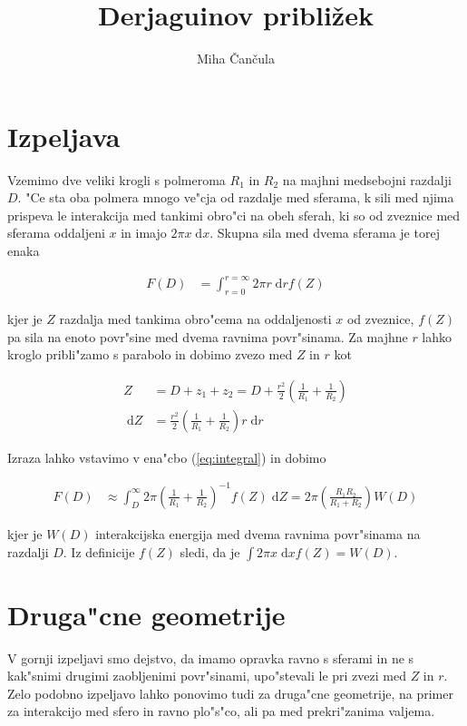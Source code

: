 \documentclass[a4paper,10pt]{article}
\title{Derjaguinov pribli\v zek}
\author{Miha \v Can\v cula}
\newcommand{\dd}{\;\mathrm{d}}
\begin{document}
\maketitle

\section{Izpeljava}

Vzemimo dve veliki krogli s polmeroma $R_1$ in $R_2$ na majhni medsebojni razdalji $D$. 
"Ce sta oba polmera mnogo ve"cja od razdalje med sferama, k sili med njima prispeva le interakcija med tankimi obro"ci na obeh sferah, ki so od zveznice med sferama oddaljeni $x$ in imajo $2\pi x \dd x$. 
Skupna sila med dvema sferama je torej enaka

\begin{align}
\label{eq:integral}
 F(D) &= \int_{r=0}^{r=\infty} 2\pi r \dd r f(Z)
\end{align}

kjer je $Z$ razdalja med tankima obro"cema na oddaljenosti $x$ od zveznice, $f(Z)$ pa sila na enoto povr"sine med dvema ravnima povr"sinama. 
Za majhne $r$ lahko kroglo pribli"zamo s parabolo in dobimo zvezo med $Z$ in $r$ kot

\begin{align}
 Z &= D + z_1 + z_2 = D + \frac{r^2}{2} \left(\frac{1}{R_1} + \frac{1}{R_2}\right) \\
 \dd Z &= \frac{r^2}{2} \left(\frac{1}{R_1} + \frac{1}{R_2}\right)r \dd r
\end{align}

Izraza lahko vstavimo v ena"cbo (\ref{eq:integral}) in dobimo

\begin{align}
 F(D) &\approx \int_D^\infty 2\pi \left(\frac{1}{R_1} + \frac{1}{R_2}\right)^{-1}f(Z) \dd Z = 2\pi \left(\frac{R_1R_2}{R_1 + R_2}\right) W(D)
\end{align}

kjer je $W(D)$ interakcijska energija med dvema ravnima povr"sinama na razdalji $D$. Iz definicije $f(Z)$ sledi, da je $\int 2\pi x \dd x f(Z) = W(D)$. 

\section{Druga"cne geometrije}

V gornji izpeljavi smo dejstvo, da imamo opravka ravno s sferami in ne s kak"snimi drugimi zaobljenimi povr"sinami, upo"stevali le pri zvezi med $Z$ in $r$. 
Zelo podobno izpeljavo lahko ponovimo tudi za druga"cne geometrije, na primer za interakcijo med sfero in ravno plo"s"co, ali pa med prekri"zanima valjema. 
\end{document}
